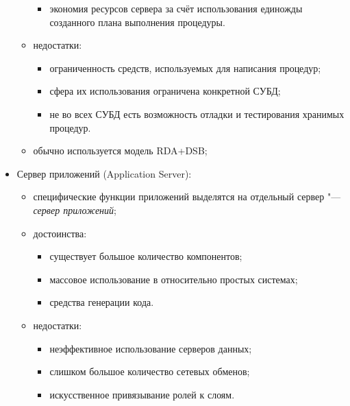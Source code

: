 \begin{itemize}
\begin{itemize}
\begin{itemize}
					\item экономия ресурсов сервера за счёт использования единожды созданного плана выполнения процедуры.
				\end{itemize}
			\item недостатки:
				\begin{itemize}
					\item ограниченность средств, используемых для написания процедур;
					\item сфера их использования ограничена конкретной СУБД;
					\item не во всех СУБД есть возможность отладки и тестирования хранимых процедур.
				\end{itemize}
			\item обычно используется модель RDA+DSB;
		\end{itemize}
	\item Сервер приложений (Application Server):
		\begin{itemize}
			\item специфические функции приложений выделятся на отдельный сервер "--- \emph{сервер приложений};
			\item достоинства:
				\begin{itemize}
					\item существует большое количество компонентов;
					\item массовое использование в относительно простых системах;
					\item средства генерации кода.
				\end{itemize}
			\item недостатки:
				\begin{itemize}
					\item неэффективное использование серверов данных;
					\item слишком большое количество сетевых обменов;
					\item искусственное привязывание ролей к слоям.
				\end{itemize}
		\end{itemize}
\end{itemize}
